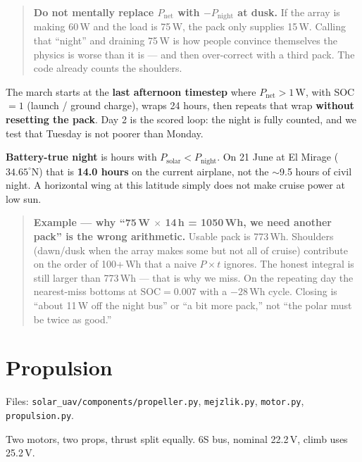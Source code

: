 \documentclass[11pt,letterpaper]{article}
\newcommand{\code}[1]{\texttt{#1}}
\newenvironment{examplebox}{\begin{quote}\small}{\end{quote}}
\newenvironment{warningbox}{\begin{quote}\small}{\end{quote}}
\begin{document}
\begin{warningbox}
\textbf{Do not mentally replace $P_\mathrm{net}$ with $-P_\mathrm{night}$ at dusk.} If the array is making 60\,W and the load is 75\,W, the pack only supplies 15\,W. Calling that ``night'' and draining 75\,W is how people convince themselves the physics is worse than it is --- and then over-correct with a third pack. The code already counts the shoulders.
\end{warningbox}

The march starts at the \textbf{last afternoon timestep} where $P_\mathrm{net} > 1\,\mathrm{W}$, with SOC $= 1$ (launch / ground charge), wraps 24 hours, then repeats that wrap \textbf{without resetting the pack}. Day 2 is the scored loop: the night is fully counted, and we test that Tuesday is not poorer than Monday.

\textbf{Battery-true night} is hours with $P_\mathrm{solar} < P_\mathrm{night}$. On 21 June at El Mirage ($34.65^\circ\mathrm{N}$) that is \textbf{14.0 hours} on the current airplane, not the $\sim$9.5 hours of civil night. A horizontal wing at this latitude simply does not make cruise power at low sun.

\begin{examplebox}
\textbf{Example --- why ``75\,W $\times$ 14\,h = 1050\,Wh, we need another pack'' is the wrong arithmetic.}
Usable pack is 773\,Wh. Shoulders (dawn/dusk when the array makes some but not all of cruise) contribute on the order of 100+\,Wh that a naive $P\times t$ ignores. The honest integral is still larger than 773\,Wh --- that is why we miss. On the repeating day the nearest-miss bottoms at $\mathrm{SOC}=0.007$ with a $-28\,\mathrm{Wh}$ cycle. Closing is ``about 11\,W off the night bus'' or ``a bit more pack,'' not ``the polar must be twice as good.''
\end{examplebox}

\section{Propulsion}
\label{sec:propulsion}

Files: \code{solar\_uav/components/propeller.py}, \code{mejzlik.py}, \code{motor.py}, \code{propulsion.py}.

Two motors, two props, thrust split equally. 6S bus, nominal 22.2\,V, climb uses 25.2\,V.
\end{document}
